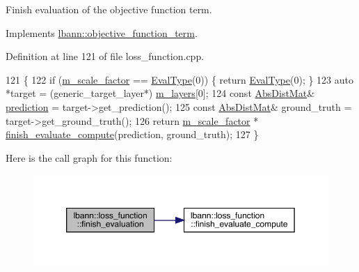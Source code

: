 Finish evaluation of the objective function term. 

Implements \hyperlink{classlbann_1_1objective__function__term_a7a82f2cdbc954655ac860896306aed0c}{lbann\+::objective\+\_\+function\+\_\+term}.



Definition at line 121 of file loss\+\_\+function.\+cpp.


\begin{DoxyCode}
121                                           \{
122   \textcolor{keywordflow}{if} (\hyperlink{classlbann_1_1objective__function__term_a59a544b8ff0455ed5091de3bf0d81c3c}{m\_scale\_factor} == \hyperlink{base_8hpp_a3266f5ac18504bbadea983c109566867}{EvalType}(0)) \{ \textcolor{keywordflow}{return} \hyperlink{base_8hpp_a3266f5ac18504bbadea983c109566867}{EvalType}(0); \}
123   \textcolor{keyword}{auto} *target = (generic\_target\_layer*) \hyperlink{classlbann_1_1objective__function__term_a9269cf0a237eacd1e220ba2739f44334}{m\_layers}[0];
124   \textcolor{keyword}{const} \hyperlink{base_8hpp_a9a697a504ae84010e7439ffec862b470}{AbsDistMat}& \hyperlink{base_8hpp_a2781a159088df64ed7d47cc91c4dc0a8ac41b9ec75e920b610e8907e066074b30}{prediction} = target->get\_prediction();
125   \textcolor{keyword}{const} \hyperlink{base_8hpp_a9a697a504ae84010e7439ffec862b470}{AbsDistMat}& ground\_truth = target->get\_ground\_truth();
126   \textcolor{keywordflow}{return} \hyperlink{classlbann_1_1objective__function__term_a59a544b8ff0455ed5091de3bf0d81c3c}{m\_scale\_factor} * \hyperlink{classlbann_1_1loss__function_a3ea8553a4e9c75477d7d4fc533c4d4fd}{finish\_evaluate\_compute}(prediction, 
      ground\_truth);
127 \}
\end{DoxyCode}
Here is the call graph for this function\+:\nopagebreak
\begin{figure}[H]
\begin{center}
\leavevmode
\includegraphics[width=350pt]{classlbann_1_1loss__function_a5264d3e71125b7ce8694f73bf25662f7_cgraph}
\end{center}
\end{figure}
\mbox{\label{classlbann_1_1loss__function_ae948babd62a110e2407271f24dcaec1b}} 
